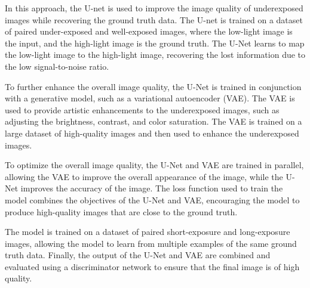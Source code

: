 \documentclass{article}
\begin{document}
In this approach, the U-net is used to improve the image quality of underexposed images while recovering the ground truth data. The U-net is trained on a dataset of paired under-exposed and well-exposed images, where the low-light image is the input, and the high-light image is the ground truth. The U-Net learns to map the low-light image to the high-light image, recovering the lost information due to the low signal-to-noise ratio.

To further enhance the overall image quality, the U-Net is trained in conjunction with a generative model, such as a variational autoencoder (VAE). The VAE is used to provide artistic enhancements to the underexposed images, such as adjusting the brightness, contrast, and color saturation. The VAE is trained on a large dataset of high-quality images and then used to enhance the underexposed images.

To optimize the overall image quality, the U-Net and VAE are trained in parallel, allowing the VAE to improve the overall appearance of the image, while the U-Net improves the accuracy of the image. The loss function used to train the model combines the objectives of the U-Net and VAE, encouraging the model to produce high-quality images that are close to the ground truth.

The model is trained on a dataset of paired short-exposure and long-exposure images, allowing the model to learn from multiple examples of the same ground truth data. Finally, the output of the U-Net and VAE are combined and evaluated using a discriminator network to ensure that the final image is of high quality.




\medskip
\printbibliography %
\end{document}

